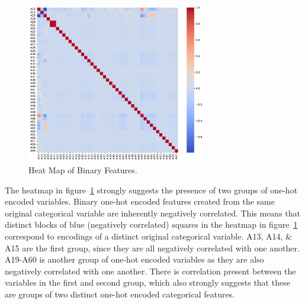 \documentclass[11pt]{report}
\begin{document}
\begin{figure}[H]
    \centering
    \includegraphics[width=0.7\textwidth]{images/binary_heatmap.pdf}
    \caption{Heat Map of Binary Features.}
    \label{fig:binary_heatmap}
\end{figure}

The heatmap in figure~\ref{fig:binary_heatmap} strongly suggests the presence of two groups of one-hot encoded variables. Binary one-hot encoded features created from the same original categorical variable are inherently negatively correlated. This means that distinct blocks of blue (negatively correlated) squares in the heatmap in figure~\ref{fig:binary_heatmap} correspond to encodings of a distinct original categorical variable. A13, A14, \& A15 are the first group, since they are all negatively correlated with one another. A19-A60 is another group of one-hot encoded variables as they are also negatively correlated with one another. There is correlation present between the variables in the first and second group, which also strongly suggests that these are groups of two distinct one-hot encoded categorical features.
\end{document}
